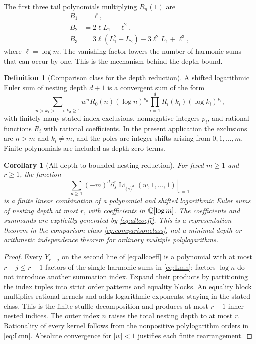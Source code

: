 \documentclass[11pt]{article}
\numberwithin{equation}{section}
\newtheorem{corollary}[theorem]{Corollary}
\theoremstyle{definition}\newtheorem{definition}[theorem]{Definition}
\theoremstyle{remark}\newtheorem{remark}[theorem]{Remark}
\DeclareMathOperator{\Li}{Li}
\begin{document}
The first three tail polynomials multiplying $R_n(1)$ are
\begin{align}
 B_1&=\ell,\\
 B_2&=2\ell L_1-\ell^2,\\
 B_3&=3\ell(L_1^2+L_2)-3\ell^2L_1+\ell^3,
 \label{eq:tailBell}
\end{align}
where $\ell=\log m$. The vanishing factor lowers the number of harmonic
sums that can occur by one. This is the mechanism behind the depth bound.

\begin{definition}[Comparison class for the depth reduction]
A shifted logarithmic Euler sum of nesting depth $d+1$ is a convergent sum
of the form
\begin{equation}
 \sum_{n>k_1>\cdots>k_d\ge1}
 w^n R_0(n)(\log n)^{p_0}
       \prod_{i=1}^d R_i(k_i)(\log k_i)^{p_i},
 \label{eq:comparisonclass}
\end{equation}
with finitely many stated index exclusions, nonnegative integers $p_i$,
and rational functions $R_i$ with rational coefficients. In the present
application the exclusions are $n>m$ and $k_i\ne m$, and the poles are
integer shifts arising from $0,1,\ldots,m$. Finite polynomials are included
as depth-zero terms.
\end{definition}

\begin{corollary}[All-depth to bounded-nesting reduction]
\label{cor:depth}
For fixed $m\ge1$ and $r\ge1$, the function
\begin{equation}
 \sum_{d\ge1}(-m)^d
       \left.\partial_s^r\Li_{\{s\}^d}(w,1,\ldots,1)\right|_{s=1}
 \label{eq:depthcollapse}
\end{equation}
is a finite linear combination of a polynomial and shifted logarithmic
Euler sums of nesting depth at most $r$, with coefficients in
$\mathbb Q[\log m]$. The coefficients and summands are explicitly generated by
\eqref{eq:allcoeff}. This is a representation theorem in the comparison
class \eqref{eq:comparisonclass}, not a minimal-depth or arithmetic
independence theorem for ordinary multiple polylogarithms.
\end{corollary}
\begin{proof}
Every $Y_{r-j}$ on the second line of \eqref{eq:allcoeff} is a polynomial
with at most $r-j\le r-1$ factors of the single harmonic sums in
\eqref{eq:Lmn}; factors $\log n$ do not introduce another summation index.
Expand their products by partitioning the index tuples into strict order
patterns and equality blocks. An equality block multiplies rational
kernels and adds logarithmic exponents, staying in the stated class.
This is the finite stuffle decomposition and produces at most $r-1$
inner nested indices. The outer index $n$ raises the total nesting depth
to at most $r$. Rationality of every kernel follows from the nonpositive
polylogarithm orders in \eqref{eq:Lmn}. Absolute convergence for $|w|<1$
justifies each finite rearrangement.
\end{proof}
\end{document}
